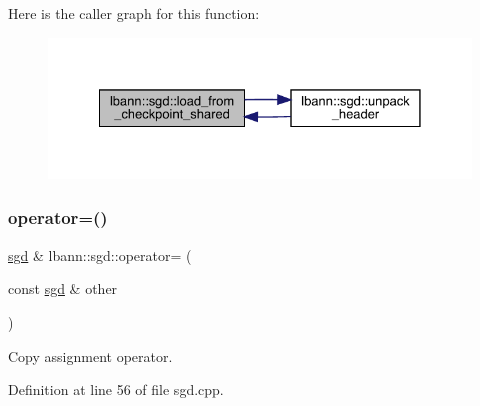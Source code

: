 Here is the caller graph for this function\+:\nopagebreak
\begin{figure}[H]
\begin{center}
\leavevmode
\includegraphics[width=328pt]{classlbann_1_1sgd_aa3e3237a59b0593d7caf7357b7c181cf_icgraph}
\end{center}
\end{figure}
\mbox{\label{classlbann_1_1sgd_ad3949e74505cd25b267dbdd5b510a83f}} 
\subsubsection{\texorpdfstring{operator=()}{operator=()}}
{\footnotesize\ttfamily \hyperlink{classlbann_1_1sgd}{sgd} \& lbann\+::sgd\+::operator= (\begin{DoxyParamCaption}\item[{const \hyperlink{classlbann_1_1sgd}{sgd} \&}]{other }\end{DoxyParamCaption})}

Copy assignment operator. 

Definition at line 56 of file sgd.\+cpp.


